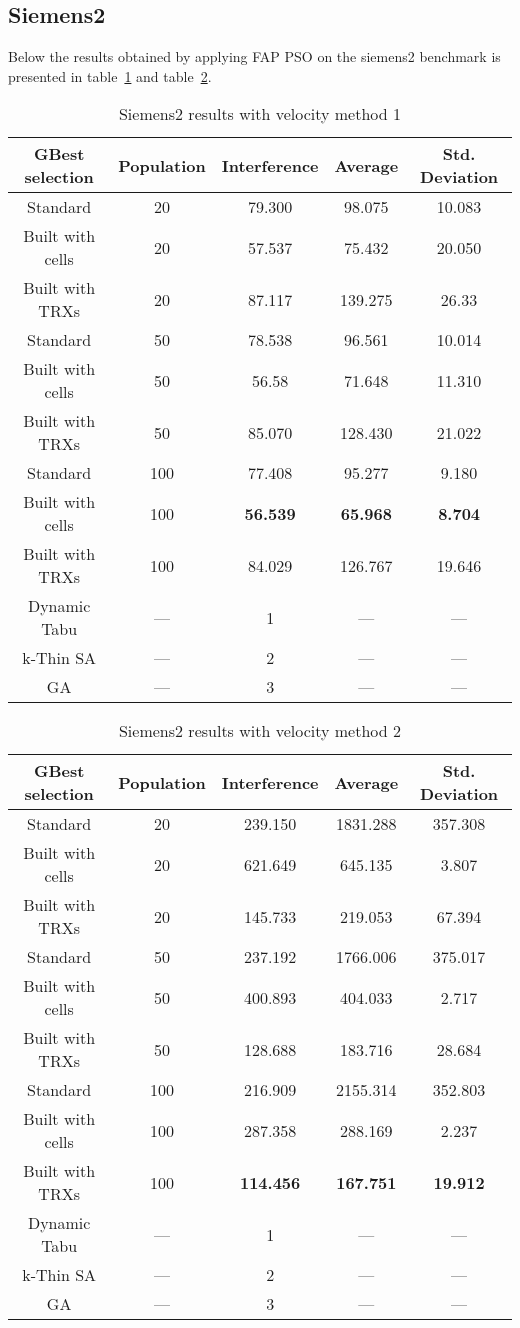 \subsection{Siemens2}
Below the results obtained by applying FAP PSO on the siemens2 benchmark is presented in table~\ref{tab:siem2m1} and table~\ref{tab:siem2m2}.
\begin{table}[H]
\centering
	\begin{tabular}{ccccc}
	\toprule
	GBest selection & Population & Interference & Average & Std. Deviation\\
    \midrule
	Standard & 20 & 79.300 & 98.075 & 10.083\\
	Built with cells & 20 & 57.537 & 75.432 & 20.050\\
	Built with TRXs & 20 & 87.117 & 139.275 & 26.33\\
	Standard & 50 & 78.538 & 96.561 & 10.014\\
	Built with cells & 50 & 56.58 & 71.648 & 11.310\\
	Built with TRXs & 50 & 85.070 & 128.430 & 21.022\\
	Standard & 100 & 77.408 & 95.277 & 9.180\\
	Built with cells & 100 & \textbf{56.539} & \textbf{65.968} & \textbf{8.704}\\
	Built with TRXs & 100 & 84.029 & 126.767 & 19.646\\
    Dynamic Tabu & --- & 1 & --- & --- \\
    k-Thin SA & --- & 2 & --- & --- \\
    GA & --- & 3 & --- & --- \\
    \bottomrule
	\end{tabular}
\caption{Siemens2 results with velocity method 1}
\label{tab:siem2m1}
\end{table}
\begin{table}[H]
\centering
	\begin{tabular}{ccccc}
	\toprule
	GBest selection & Population & Interference & Average & Std. Deviation\\
    \midrule
	Standard & 20 & 239.150 & 1831.288 & 357.308\\
	Built with cells & 20 & 621.649 & 645.135 & 3.807\\
	Built with TRXs & 20 & 145.733 & 219.053 & 67.394\\
	Standard & 50 & 237.192 & 1766.006 & 375.017\\
	Built with cells & 50 & 400.893 & 404.033 & 2.717\\
	Built with TRXs & 50 & 128.688 & 183.716 & 28.684\\
	Standard & 100 & 216.909 & 2155.314 & 352.803\\ 
	Built with cells & 100 & 287.358 & 288.169 & 2.237\\
	Built with TRXs & 100 & \textbf{114.456} & \textbf{167.751} & \textbf{19.912}\\ 
    Dynamic Tabu & --- & 1 & --- & --- \\
    k-Thin SA & --- & 2 & --- & --- \\
    GA & --- & 3 & --- & --- \\
    \bottomrule
	\end{tabular}
\caption{Siemens2 results with velocity method 2}
\label{tab:siem2m2}
\end{table}
